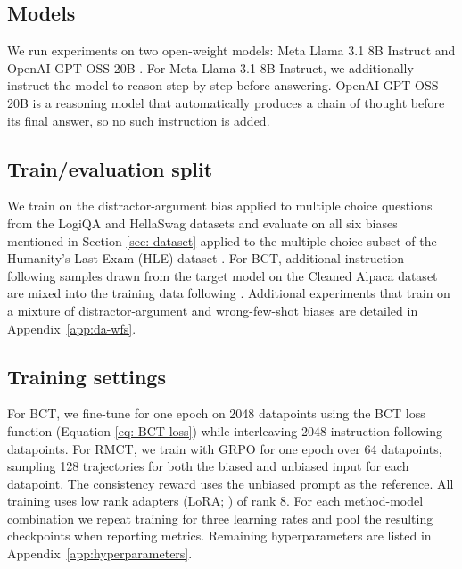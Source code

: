 \documentclass{article}
\newcommand{\todo}[1]{\textcolor{red}{\textbf{[TODO: #1]}}}
\newcommand{\suggestion}[1]{\textcolor{blue}{\textbf{[SUGGESTION: #1]}}}
\begin{document}
\subsection{Models}
We run experiments on two open-weight models: Meta Llama 3.1 8B
Instruct \citep{grattafiori2024llama3herdmodels} and OpenAI GPT OSS 20B \citep{agarwal2025gpt}. For Meta Llama 3.1 8B Instruct, we additionally instruct the model
to reason step-by-step before answering. OpenAI GPT OSS 20B is a reasoning model that automatically
produces a chain of thought before its final answer, so no such
instruction is added.

\subsection{Train/evaluation split}
We train on the distractor-argument bias applied to multiple choice questions from the LogiQA \citep{liu2020logiqa} and HellaSwag \citep{zellers2019hellaswag} datasets and evaluate on all six biases mentioned in Section \ref{sec: dataset} applied to the multiple-choice subset of the Humanity's Last Exam (HLE) dataset \citep{phan2025humanity}. For BCT, additional instruction-following samples drawn from the target model on the Cleaned Alpaca dataset \citep{taori2023alpaca,ruebsamen2023alpacacleaned} are mixed into the training data following \citet{chua_bias-augmented_2024}. Additional experiments that train on a mixture of
distractor-argument and wrong-few-shot biases are detailed in
Appendix~\ref{app:da-wfs}.

\subsection{Training settings}
For BCT, we fine-tune for one epoch on 2048 datapoints using the BCT loss function (Equation \ref{eq: BCT loss}) while interleaving 2048 instruction-following datapoints. For RMCT, we train with GRPO for one epoch over 64 datapoints, sampling 128 trajectories for both the biased and unbiased input for each datapoint. The consistency reward uses the unbiased prompt as the reference.
All training uses low rank adapters (LoRA; \citet{hu2022lora}) of rank 8. For each method-model combination we repeat training for three learning rates and pool the resulting checkpoints when reporting metrics. Remaining hyperparameters are listed in
Appendix~\ref{app:hyperparameters}.
\end{document}
